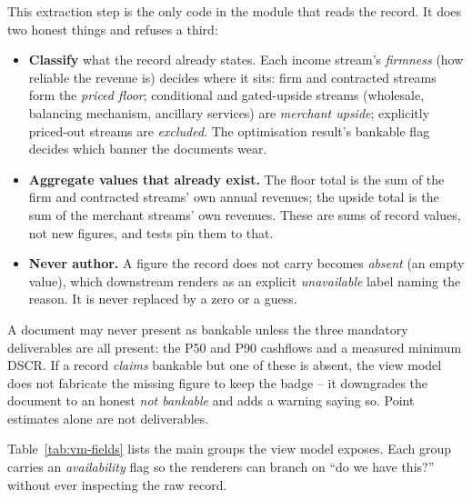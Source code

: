 This extraction step is the only code in the module that reads the record. It does two honest things and refuses a third:

\begin{itemize}
  \item \textbf{Classify} what the record already states. Each income stream's \emph{firmness} (how reliable the revenue is) decides where it sits: firm and contracted streams form the \emph{priced floor}; conditional and gated-upside streams (wholesale, balancing mechanism, ancillary services) are \emph{merchant upside}; explicitly priced-out streams are \emph{excluded}. The optimisation result's bankable flag decides which banner the documents wear.
  \item \textbf{Aggregate values that already exist.} The floor total is the sum of the firm and contracted streams' own annual revenues; the upside total is the sum of the merchant streams' own revenues. These are sums of record values, not new figures, and tests pin them to that.
  \item \textbf{Never author.} A figure the record does not carry becomes \emph{absent} (an empty value), which downstream renders as an explicit \emph{unavailable} label naming the reason. It is never replaced by a zero or a guess.
\end{itemize}

\begin{caution}
A document may never present as bankable unless the three mandatory deliverables are all present: the P50 and P90 cashflows and a measured minimum DSCR. If a record \emph{claims} bankable but one of these is absent, the view model does not fabricate the missing figure to keep the badge -- it downgrades the document to an honest \emph{not bankable} and adds a warning saying so. Point estimates alone are not deliverables.
\end{caution}

Table~\ref{tab:vm-fields} lists the main groups the view model exposes. Each group carries an \emph{availability} flag so the renderers can branch on ``do we have this?'' without ever inspecting the raw record.

